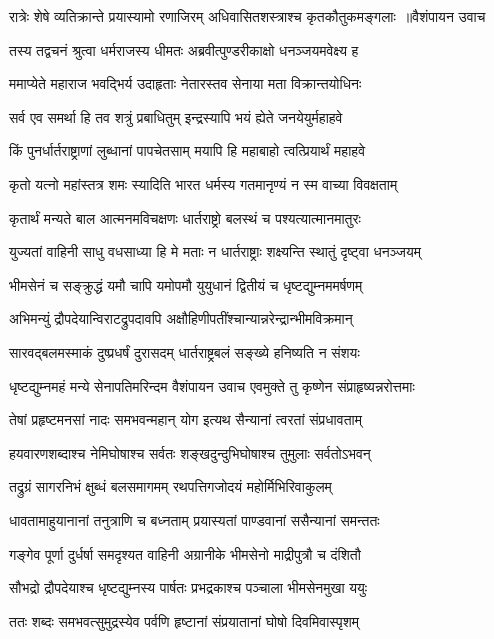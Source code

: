 \threelineshloka
{रात्रेः शेषे व्यतिक्रान्ते प्रयास्यामो रणाजिरम्}
{अधिवासितशस्त्राश्च कृतकौतुकमङ्गलाः ॥वैशंपायन उवाच}
{}


\twolineshloka
{तस्य तद्वचनं श्रुत्वा धर्मराजस्य धीमतः}
{अब्रवीत्पुण्डरीकाक्षो धनञ्जयमवेक्ष्य ह}


\twolineshloka
{ममाप्येते महाराज भवद्भिर्य उदाहृताः}
{नेतारस्तव सेनाया मता विक्रान्तयोधिनः}


\twolineshloka
{सर्व एव समर्था हि तव शत्रुं प्रबाधितुम्}
{इन्द्रस्यापि भयं ह्येते जनयेयुर्महाहवे}


\twolineshloka
{किं पुनर्धार्तराष्ट्राणां लुब्धानां पापचेतसाम्}
{मयापि हि महाबाहो त्वत्प्रियार्थं महाहवे}


\twolineshloka
{कृतो यत्नो महांस्तत्र शमः स्यादिति भारत}
{धर्मस्य गतमानृण्यं न स्म वाच्या विवक्षताम्}


\twolineshloka
{कृतार्थं मन्यते बाल आत्मनमविचक्षणः}
{धार्तराष्ट्रो बलस्थं च पश्यत्यात्मानमातुरः}


\twolineshloka
{युज्यतां वाहिनी साधु वधसाध्या हि मे मताः}
{न धार्तराष्ट्राः शक्ष्यन्ति स्थातुं दृष्ट्वा धनञ्जयम्}


\twolineshloka
{भीमसेनं च सङ्क्रुद्धं यमौ चापि यमोपमौ}
{युयुधानं द्वितीयं च धृष्टद्युम्नममर्षणम्}


\twolineshloka
{अभिमन्युं द्रौपदेयान्विराटद्रुपदावपि}
{अक्षौहिणीपतींश्चान्यान्नरेन्द्रान्भीमविक्रमान्}


\twolineshloka
{सारवद्बलमस्माकं दुष्प्रधर्षं दुरासदम्}
{धार्तराष्ट्रबलं सङ्ख्ये हनिष्यति न संशयः}


\threelineshloka
{धृष्टद्युम्नमहं मन्ये सेनापतिमरिन्दम}
{वैशंपायन उवाच}
{एवमुक्ते तु कृष्णेन संप्राहृष्यन्नरोत्तमाः}


\twolineshloka
{तेषां प्रहृष्टमनसां नादः समभवन्महान्}
{योग इत्यथ सैन्यानां त्वरतां संप्रधावताम्}


\twolineshloka
{हयवारणशब्दाश्च नेमिघोषाश्च सर्वतः}
{शङ्खदुन्दुभिघोषाश्च तुमुलाः सर्वतोऽभवन्}


\twolineshloka
{तद्रुग्रं सागरनिभं क्षुब्धं बलसमागमम्}
{रथपत्तिगजोदयं महोर्मिभिरिवाकुलम्}


\twolineshloka
{धावतामाहुयानानां तनुत्राणि च बध्नताम्}
{प्रयास्यतां पाण्डवानां ससैन्यानां समन्ततः}


\twolineshloka
{गङ्गेव पूर्णा दुर्धर्षा समदृश्यत वाहिनी}
{अग्रानीके भीमसेनो माद्रीपुत्रौ च दंशितौ}


\twolineshloka
{सौभद्रो द्रौपदेयाश्च धृष्टद्युम्नस्य पार्षतः}
{प्रभद्रकाश्च पञ्चाला भीमसेनमुखा ययुः}


\twolineshloka
{ततः शब्दः समभवत्सुमुद्रस्येव पर्वणि}
{हृष्टानां संप्रयातानां घोषो दिवमिवास्पृशम्}


